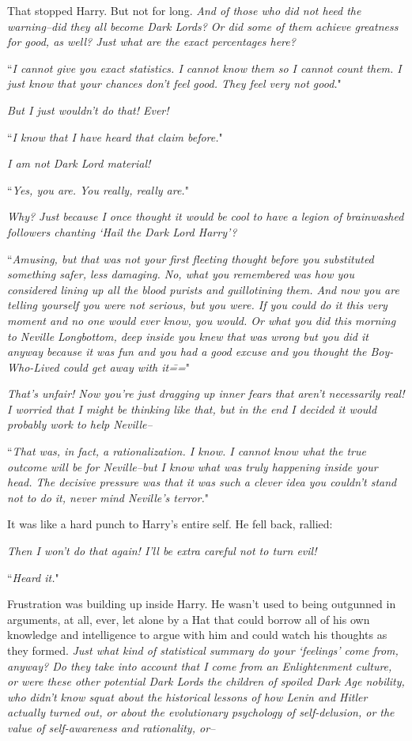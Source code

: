 That stopped Harry. But not for long. \emph{And of those who did \emph{not} heed the warning\---did they \emph{all} become Dark Lords? Or did some of them achieve greatness for good, as well? Just what are the exact percentages here?}

``\emph{I cannot give you exact statistics. I cannot know them so I cannot count them. I just know that your chances don't feel good. They feel \emph{very} not good.}"

\emph{But I just wouldn't do that! Ever!}

``\emph{I know that I have heard that claim before.}"

\emph{I am not Dark Lord material!}

``\emph{Yes, you are. You really, \emph{really} are.}"

\emph{Why? Just because I once thought it would be cool to have a legion of brainwashed followers chanting `Hail the Dark Lord Harry'?}

``\emph{Amusing, but that was not your first fleeting thought before you substituted something safer, less damaging. No, what you remembered was how you considered lining up all the blood purists and guillotining them. And now you are telling yourself you were not serious, but you were. If you could do it this very moment and no one would ever know, you would. Or what you did this morning to Neville Longbottom, deep inside you \emph{knew} that was wrong but you did it \emph{anyway} because it was \emph{fun} and you had a \emph{good excuse} and you thought the Boy-Who-Lived could \emph{get away} with it\===}"

\emph{That's unfair! Now you're just dragging up inner fears that \emph{aren't} necessarily real! I \emph{worried} that I \emph{might} be thinking like that, but in the end I decided it would probably \emph{work} to help Neville\---}

``\emph{That was, in fact, a rationalization. I know. I cannot know what the true outcome will be for Neville\---but I know what was truly happening inside your head. The decisive pressure was that it was such a clever idea you couldn't stand \emph{not} to do it, never mind Neville's terror.}"

It was like a hard punch to Harry's entire self. He fell back, rallied:

\emph{Then I won't do that again! I'll be extra careful not to turn evil!}

``\emph{Heard it.}"

Frustration was building up inside Harry. He wasn't used to being outgunned in arguments, at all, ever, let alone by a Hat that could borrow all of his own knowledge and intelligence to argue with him and could watch his thoughts as they formed. \emph{Just what kind of statistical summary do your `feelings' come from, anyway? Do they take into account that I come from an Enlightenment culture, or were these other potential Dark Lords the children of spoiled Dark Age nobility, who didn't know squat about the historical lessons of how Lenin and Hitler actually turned out, or about the evolutionary psychology of self-delusion, or the value of self-awareness and rationality, or\---}


